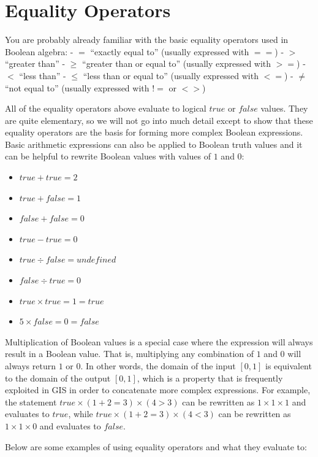 \documentclass[
]{book}
\providecommand{\tightlist}{%
  \setlength{\itemsep}{0pt}\setlength{\parskip}{0pt}}
\begin{document}
\hypertarget{equality-operators}{%
\section{Equality Operators}\label{equality-operators}}

You are probably already familiar with the basic equality operators used in Boolean algebra:
- \(=\) ``exactly equal to'' (usually expressed with \(==\))
- \(>\) ``greater than''
- \(≥\) ``greater than or equal to'' (usually expressed with \(>=\))
- \(<\) ``less than''
- \(≤\) ``less than or equal to'' (usually expressed with \(<=\))
- \(≠\) ``not equal to'' (usually expressed with \(!=\) or \(<>\))

All of the equality operators above evaluate to logical \(true\) or \(false\) values. They are quite elementary, so we will not go into much detail except to show that these equality operators are the basis for forming more complex Boolean expressions. Basic arithmetic expressions can also be applied to Boolean truth values and it can be helpful to rewrite Boolean values with values of \(1\) and \(0\):

\begin{itemize}
\tightlist
\item
  \(true+true=2\)
\item
  \(true+false=1\)
\item
  \(false+false=0\)
\item
  \(true-true=0\)
\item
  \(true÷false=undefined\)
\item
  \(false÷true=0\)
\item
  \(true×true=1=true\)
\item
  \(5×false=0=false\)
\end{itemize}

Multiplication of Boolean values is a special case where the expression will always result in a Boolean value. That is, multiplying any combination of \(1\) and \(0\) will always return \(1\) or \(0\). In other words, the domain of the input \([0,1]\) is equivalent to the domain of the output \([0,1]\), which is a property that is frequently exploited in GIS in order to concatenate more complex expressions. For example, the statement \(true×(1+2=3)×(4>3)\) can be rewritten as \(1×1×1\) and evaluates to \(true\), while \(true×(1+2=3)×(4<3)\) can be rewritten as \(1×1×0\) and evaluates to \(false\).

Below are some examples of using equality operators and what they evaluate to:
\end{document}
